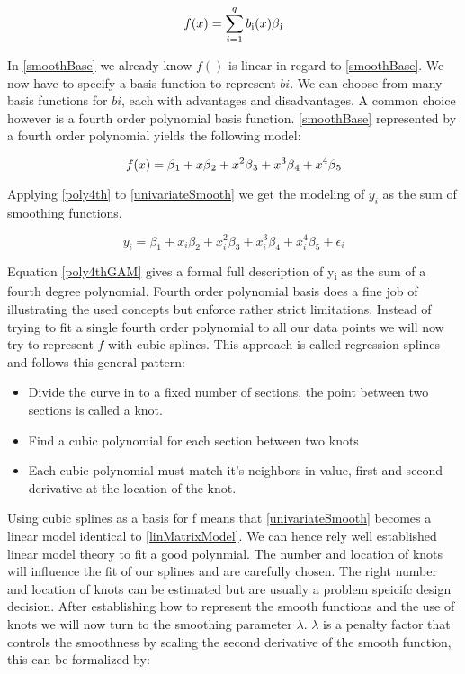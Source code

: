 \documentclass{article}
\begin{document}
    \begin{equation} \label{smoothBase} f(x) = \sum_{i=1}^{q} b\textsubscript{i} (x) \beta \textsubscript{i} \end{equation}

    In \ref{smoothBase} we already know $f()$ is linear in regard to \ref{smoothBase}. We now have to specify a basis function to represent $bi$. We can choose from many basis functions for $bi$, each with advantages and disadvantages. A common choice however is a fourth order polynomial basis function. \ref{smoothBase} represented by a fourth order polynomial yields the following model:

    \begin{equation} \label{poly4th} f(x) = \beta \textsubscript{1} + x\beta \textsubscript{2} + x^2\beta \textsubscript{3} + x^3\beta \textsubscript{4} + x^4\beta \textsubscript{5}  \end{equation}

    Applying \ref{poly4th} to \ref{univariateSmooth} we get the modeling of $y_i$ as the sum of smoothing functions.

    \begin{equation} \label{poly4thGAM}  y_i = \beta_1 + x_i\beta_2 + x_i^2\beta_3+ x_i^3\beta_4 + x_i^4\beta_5 + \epsilon_i \end{equation}

    Equation \ref{poly4thGAM} gives a formal full description of  y\textsubscript{i} as the sum of a fourth degree polynomial. Fourth order polynomial basis does a fine job of illustrating the used concepts but enforce rather strict limitations. Instead of trying to fit a single fourth order polynomial to all our data points we will now try to represent $f$ with cubic splines. This approach is called regression splines and follows this general pattern:

    \begin{itemize}

    \item Divide the curve in to a fixed number of sections, the point between two sections is called a knot.
    \item Find a cubic polynomial for each section between two knots
    \item Each cubic polynomial must match it's neighbors in value, first and second derivative at the location of the knot.

    \end{itemize}

    Using cubic splines as a basis for f means that \ref{univariateSmooth} becomes a linear model identical to \ref{linMatrixModel}. We can hence rely well established linear model theory to fit a good polynmial. The number and location of knots will influence the fit of our splines and are carefully chosen. The right number and location of knots can be estimated but are usually a problem speicifc design decision. After establishing how to represent the smooth functions and the use of knots we will now turn to the smoothing parameter $\lambda$. $\lambda$ is a penalty factor that controls the smoothness by scaling the second derivative of the smooth function, this can be formalized by:
\end{document}
